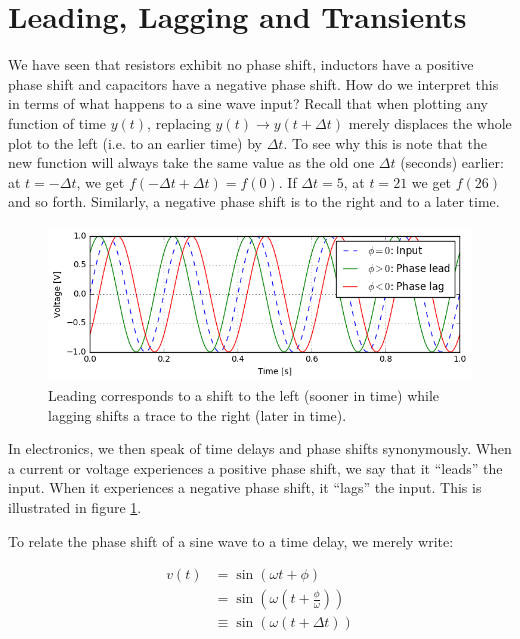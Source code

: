 \documentclass{tufte-book}
\begin{document}
\section{Leading, Lagging and Transients}
We have seen that resistors exhibit no phase shift, inductors have a positive phase shift and capacitors have a negative phase shift. How do we interpret this in terms of what happens to a sine wave input? Recall that when plotting any function of time $y(t)$, replacing $y(t) \rightarrow y(t+\Delta t)$ merely displaces the whole plot to the left (i.e. to an earlier time) by $\Delta t$. To see why this is note that the new function will always take the same value as the old one $\Delta t$ (seconds) earlier: at $t=-\Delta t$, we get $f(-\Delta t + \Delta t) = f(0)$. If $\Delta t = 5$, at $t=21$ we get $f(26)$ and so forth. Similarly, a negative phase shift is to the right and to a later time.

\begin{figure}[h]
\caption{Leading corresponds to a shift to the left (sooner in time) while lagging shifts a trace to the right (later in time).}
\label{fig:leadlag}
\begin{center}
\includegraphics[width=\textwidth]{leadlag.png}
\end{center}
\end{figure}

In electronics, we then speak of time delays and phase shifts synonymously. When a current or voltage experiences a positive phase shift, we say that it ``leads'' the input. When it experiences a negative phase shift, it ``lags'' the input. This is illustrated in figure \ref{fig:leadlag}.

\noindent To relate the phase shift of a sine wave to a time delay, we merely write:

\begin{align}\label{eq:phase_time_sine_1}
v(t) &= \sin\left(\omega t + \phi\right) \nonumber\\
     &= \sin\left(\omega\left(t + \frac{\phi}{\omega}\right)\right) \nonumber\\
     &\equiv \sin\left(\omega\left(t + \Delta t\right)\right) 
\end{align}
\end{document}
